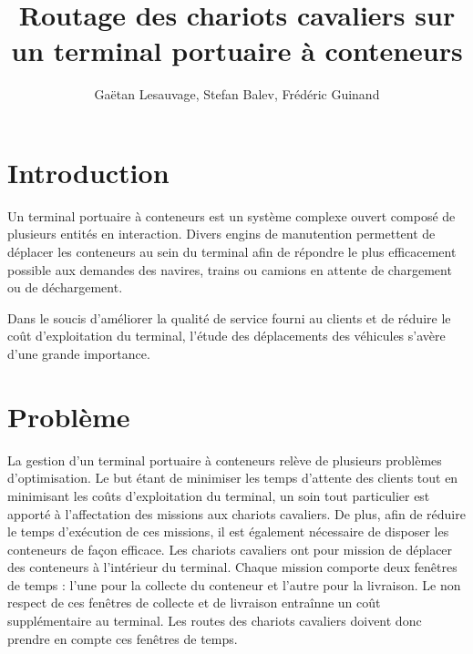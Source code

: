 \documentclass{roadef2011}
\begin{document}
\title{Routage des chariots cavaliers sur un terminal portuaire à conteneurs}

\def\shorttitle{Titre court}

\author{Gaëtan Lesauvage, Stefan Balev, Frédéric Guinand}


{}


\maketitle
\thispagestyle{empty}


\section{Introduction}

Un terminal portuaire à conteneurs est un système complexe ouvert composé de plusieurs entités en interaction. Divers engins de manutention permettent de déplacer les conteneurs au sein du terminal afin de répondre le plus efficacement possible aux demandes des navires, trains ou camions en attente de chargement ou de déchargement. 

Dans le soucis d'améliorer la qualité de service fourni au clients et de réduire le coût d'exploitation du terminal, l'étude des déplacements des véhicules s'avère d'une grande importance. 

\section{Problème}
La gestion d’un terminal portuaire à conteneurs relève de plusieurs problèmes d’optimisation. Le but étant de minimiser les temps d’attente des clients tout en minimisant les coûts d’exploitation du terminal, un soin tout particulier est apporté à l’affectation des missions aux chariots cavaliers. De plus, afin de réduire le temps d’exécution de ces missions, il est également nécessaire de disposer les conteneurs de façon efficace.
Les chariots cavaliers ont pour mission de déplacer des conteneurs à l'intérieur du terminal. Chaque mission comporte deux fenêtres de temps : l'une pour la collecte du conteneur et l'autre pour la livraison. Le non respect de ces fenêtres de collecte et de livraison entraînne un coût supplémentaire au terminal. Les routes des chariots cavaliers doivent donc prendre en compte ces fenêtres de temps.
\end{document}
